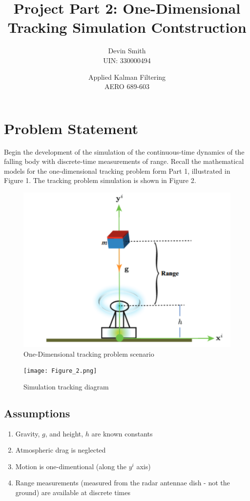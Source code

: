 \documentclass{article}
\title{Project Part 2: One-Dimensional Tracking Simulation Contstruction}
\author{Devin Smith \\ UIN: 330000494}
\date{Applied Kalman Filtering\\AERO 689-603}
\begin{document}
\maketitle

\section{Problem Statement}
Begin the development of the simulation of the continuous-time dynamics of the falling body with
discrete-time measurements of range. Recall the mathematical models for the one-dimensional tracking problem form Part 1, illustrated in Figure 1. The tracking problem simulation is shown in Figure 2.

\begin{figure}[h]
    \centering
    \includegraphics[width=1\linewidth]{Figure_1.png}
    \caption{One-Dimensional tracking problem scenario}
    \label{fig:enter-label}
\end{figure}

\begin{figure}[h]
    \centering
    \texttt{[image: Figure\_2.png]}
    \caption{Simulation tracking diagram}
    \label{fig:enter-label}
\end{figure}

\subsection{Assumptions}

\begin{enumerate}
    \item Gravity, \textbf{$g$}, and height, \textit{$h$} are known constants
    \item Atmospheric drag is neglected
    \item Motion is one-dimentional (along the \textbf{$y^i$} axis)
    \item Range measurements (measured from the radar antennae dish - not the ground) are available at discrete times
\end{enumerate}
\end{document}
